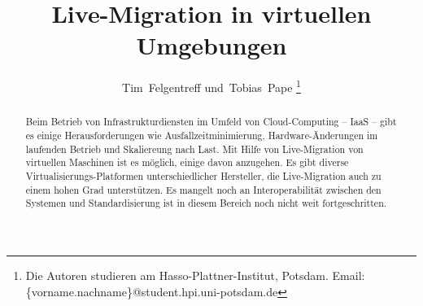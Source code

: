 \title{Live-Migration in virtuellen Umgebungen
}
\author{Tim~Felgentreff und~Tobias~Pape%
\thanks{%
  Die Autoren studieren am
  Hasso-Plattner-Institut, Potsdam.\goodbreak
  Email: \{vorname.nachname\}@student.hpi.uni-potsdam.de}%
}

\maketitle

\onlydraft{\tableofcontents}

\begin{abstract}
Beim Betrieb von Infrastrukturdiensten im Umfeld von Cloud-Computing
-- \acf{IaaS} -- gibt es 
einige Herausforderungen wie Ausfallzeitminimierung,
Hardware-Änderungen im laufenden Betrieb und Skaliereung nach Last.
Mit Hilfe von Live-Migration von virtuellen Maschinen ist es möglich,
einige davon anzugehen. Es gibt diverse
Virtualisierungs-Platformen unterschiedlicher Hersteller, die
Live-Migration auch zu einem hohen Grad unterstützen. Es mangelt noch
an Interoperabilität zwischen den Systemen und Standardisierung ist
in diesem Bereich noch nicht weit fortgeschritten.
\end{abstract}

\begin{IEEEkeywords}
\end{IEEEkeywords}
\IEEEpeerreviewmaketitle

